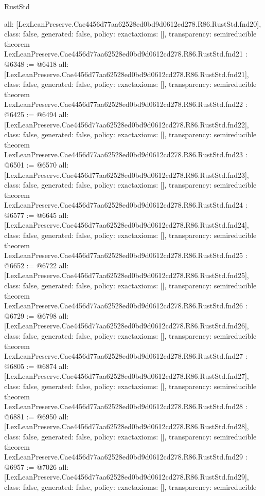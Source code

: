 \begin{lexlean}{RustStd}
\begin{coremodule}
{  all: [LexLeanPreserve.Cae4456d77aa62528ed0bd9d0612cd278.R86.RustStd.fnd20],
  class: false,
  generated: false,
  policy: exact{axioms: []},
  transparency: semireducible
}
theorem LexLeanPreserve.Cae4456d77aa62528ed0bd9d0612cd278.R86.RustStd.fnd21 : @6348 := @6418 {
  all: [LexLeanPreserve.Cae4456d77aa62528ed0bd9d0612cd278.R86.RustStd.fnd21],
  class: false,
  generated: false,
  policy: exact{axioms: []},
  transparency: semireducible
}
theorem LexLeanPreserve.Cae4456d77aa62528ed0bd9d0612cd278.R86.RustStd.fnd22 : @6425 := @6494 {
  all: [LexLeanPreserve.Cae4456d77aa62528ed0bd9d0612cd278.R86.RustStd.fnd22],
  class: false,
  generated: false,
  policy: exact{axioms: []},
  transparency: semireducible
}
theorem LexLeanPreserve.Cae4456d77aa62528ed0bd9d0612cd278.R86.RustStd.fnd23 : @6501 := @6570 {
  all: [LexLeanPreserve.Cae4456d77aa62528ed0bd9d0612cd278.R86.RustStd.fnd23],
  class: false,
  generated: false,
  policy: exact{axioms: []},
  transparency: semireducible
}
theorem LexLeanPreserve.Cae4456d77aa62528ed0bd9d0612cd278.R86.RustStd.fnd24 : @6577 := @6645 {
  all: [LexLeanPreserve.Cae4456d77aa62528ed0bd9d0612cd278.R86.RustStd.fnd24],
  class: false,
  generated: false,
  policy: exact{axioms: []},
  transparency: semireducible
}
theorem LexLeanPreserve.Cae4456d77aa62528ed0bd9d0612cd278.R86.RustStd.fnd25 : @6652 := @6722 {
  all: [LexLeanPreserve.Cae4456d77aa62528ed0bd9d0612cd278.R86.RustStd.fnd25],
  class: false,
  generated: false,
  policy: exact{axioms: []},
  transparency: semireducible
}
theorem LexLeanPreserve.Cae4456d77aa62528ed0bd9d0612cd278.R86.RustStd.fnd26 : @6729 := @6798 {
  all: [LexLeanPreserve.Cae4456d77aa62528ed0bd9d0612cd278.R86.RustStd.fnd26],
  class: false,
  generated: false,
  policy: exact{axioms: []},
  transparency: semireducible
}
theorem LexLeanPreserve.Cae4456d77aa62528ed0bd9d0612cd278.R86.RustStd.fnd27 : @6805 := @6874 {
  all: [LexLeanPreserve.Cae4456d77aa62528ed0bd9d0612cd278.R86.RustStd.fnd27],
  class: false,
  generated: false,
  policy: exact{axioms: []},
  transparency: semireducible
}
theorem LexLeanPreserve.Cae4456d77aa62528ed0bd9d0612cd278.R86.RustStd.fnd28 : @6881 := @6950 {
  all: [LexLeanPreserve.Cae4456d77aa62528ed0bd9d0612cd278.R86.RustStd.fnd28],
  class: false,
  generated: false,
  policy: exact{axioms: []},
  transparency: semireducible
}
theorem LexLeanPreserve.Cae4456d77aa62528ed0bd9d0612cd278.R86.RustStd.fnd29 : @6957 := @7026 {
  all: [LexLeanPreserve.Cae4456d77aa62528ed0bd9d0612cd278.R86.RustStd.fnd29],
  class: false,
  generated: false,
  policy: exact{axioms: []},
  transparency: semireducible
}
\end{coremodule}
\end{lexlean}
